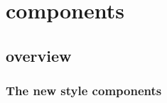 %
%


\section{components}
\subsection{overview}

\begin{frame}
%
  \frametitle{The new style components}
%
%
\end{frame}

